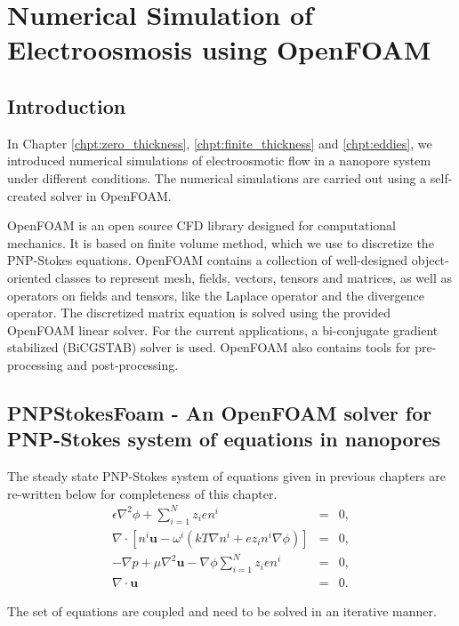 \chapter{Numerical Simulation of Electroosmosis using OpenFOAM}
\label{chpt:numerical}
\section{Introduction}
In Chapter \ref{chpt:zero_thickness}, \ref{chpt:finite_thickness} and \ref{chpt:eddies}, we introduced numerical simulations of electroosmotic flow in a nanopore system under different conditions. The numerical simulations are carried out using a self-created solver in OpenFOAM. 

OpenFOAM is an open source CFD library \cite{OPENFOAM} designed for computational mechanics. It is based on finite volume method, which we use to discretize the PNP-Stokes equations. OpenFOAM contains a collection of well-designed object-oriented classes to represent mesh, fields, vectors, tensors and matrices, as well as operators on fields and tensors, like the Laplace operator and the divergence operator. The discretized matrix equation is solved using the provided OpenFOAM linear solver. For the current applications, a bi-conjugate gradient stabilized (BiCGSTAB) solver is used. OpenFOAM also contains tools for pre-processing and post-processing.

\section{PNPStokesFoam - An OpenFOAM solver for PNP-Stokes system of equations in nanopores}
The steady state PNP-Stokes system of equations given in previous chapters are re-written below for completeness of this chapter. 
\begin{eqnarray}
\epsilon \nabla^2 \phi + \sum_{i=1}^{N} z_ien^i & = & 0,
\label{eq:poisson_num}
\\
\nabla\cdot\left\lbrack n^i\mathbf{u} -\omega^i(kT\nabla
n^i + ez_in^i\nabla\phi) \right\rbrack&=&0 ,
\label{eq:NP_num}
\\ 
-\nabla p + \mu \nabla^2 \mathbf{u} -  \nabla \phi \sum_{i=1}^{N} z_ien^i & = & 0, \label{eq:stokes_num}\\
\nabla \cdot \mathbf{u} & = & 0. \label{eq:continuity_num}
\end{eqnarray} 

The set of equations are coupled and need to be solved in an iterative manner. 

